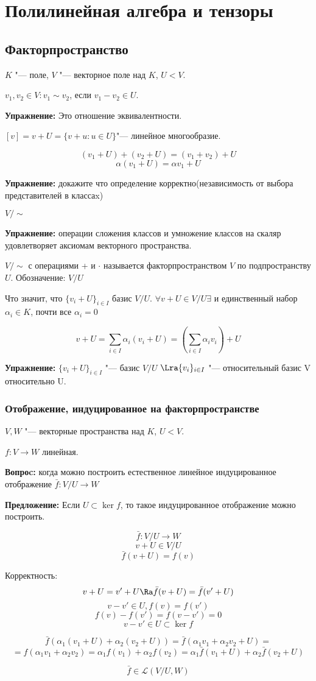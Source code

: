 ﻿\chapter{Полилинейная алгебра и тензоры}
\section{Факторпространство}
$K$ "--- поле, $V$ "--- векторное поле над $K$, $U < V$.

$v_1, v_2 \in V \colon v_1 \sim v_2$, если $v_1 - v_2 \in U$. 

\textbf{Упражнение:} Это отношение эквивалентности. 

$[v] = v + U = \{v + u\colon u \in U\}$"--- линейное многообразие. 

$$(v_1 + U) + (v_2 + U) = (v_1 + v_2) + U$$
$$\alpha(v_1 + U) = \alpha v_1 + U$$

\textbf{Упражнение:} докажите что определение корректно(независимость от выбора представителей в классаx)

$V/\sim$

\textbf{Упражнение:} операции сложения классов и умножение классов на скаляр удовлетворяет аксиомам векторного пространства.

$V/\sim$ с операциями + и $\cdot$ называется факторпространством $V$ по подпространству $U$. Обозначение: $V/U$ 

Что значит, что $\{v_i + U\}_{i \in I}$ базис $V/U$.
$\forall v + U \in V/U
\exists$ и единственный набор $\alpha_i \in K$, почти все $\alpha_i = 0$

$$v + U = \sum_{i \in I}\alpha_i(v_i + U) = (\sum_{i \in I}\alpha_i v_i) + U $$


\textbf{Упражнение:}
$\{v_i + U\}_{i \in I}$  "--- базис $V/U$
$\Lra \{v_i\}_{i \in I}$ "--- относительный базис V относительно U.

\subsection{Отображение, индуцированное на факторпространстве}
    $V, W$ "--- векторные пространства над $K$, $U < V$.

    $ f \colon V \to W$ линейная. 
    
    \textbf{Вопроc:} когда можно построить естественное линейное индуцированное отображение $\bar f \colon  V / U \to W$

    \textbf{Предложение:} Если $U \subset \ker f$, то такое индуцированное отображение можно построить. 

    $$\bar f \colon V/U \to W$$
    $$v + U \in V/U$$
    $$\bar f(v + U) = f(v)$$

    Корректность: 
    $$v + U = v' + U \Ra \bar f(v + U) = \bar f (v' + U)$$
    $$v - v' \in U, f(v) = f(v')$$
    $$f(v) - f(v') = f(v - v' ) = 0$$
    $$v - v' \in U \subset \ker f $$

    $$\bar f(\alpha_1(v_1 + U) + \alpha_2(v_2 + U)) = \bar f(\alpha_1 v_1 + \alpha_2 v_2 + U) = $$
    $$= f(\alpha_1 v_1 + \alpha_2 v_2) = \alpha_1 f(v_1) + \alpha_2 f(v_2) = \alpha_1 \bar f(v_1 + U) + \alpha_2\bar f(v_2 + U) $$

    $$\bar f \in \mathscr{L}(V/U, W)$$


